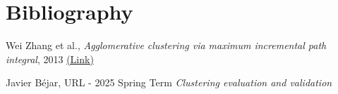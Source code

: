 \documentclass[
	10pt,
	parskip=half-,	
	paper=a4,
	english
	]{scrartcl}
\begin{document}
\newpage
\section{Bibliography}

\renewcommand{\section}[2]{}%
\begin{thebibliography}{9}

Wei Zhang et al.,
\textit{Agglomerative clustering via maximum incremental path integral}, 2013
\href{https://www.sciencedirect.com/science/article/pii/S0031320313001830}{(Link)}

Javier Béjar,
URL - 2025 Spring Term
\textit{Clustering evaluation and validation}

\end{thebibliography}
\end{document}
